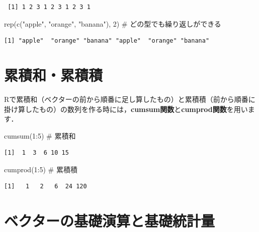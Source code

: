 \documentclass[
  letterpaper,
  DIV=11,
  numbers=noendperiod]{scrreprt}
\newenvironment{Shaded}{\begin{snugshade}}{\end{snugshade}}
\newcommand{\CommentTok}[1]{\textcolor[rgb]{0.37,0.37,0.37}{#1}}
\newcommand{\DecValTok}[1]{\textcolor[rgb]{0.68,0.00,0.00}{#1}}
\newcommand{\FunctionTok}[1]{\textcolor[rgb]{0.28,0.35,0.67}{#1}}
\newcommand{\NormalTok}[1]{\textcolor[rgb]{0.00,0.23,0.31}{#1}}
\newcommand{\SpecialCharTok}[1]{\textcolor[rgb]{0.37,0.37,0.37}{#1}}
\newcommand{\StringTok}[1]{\textcolor[rgb]{0.13,0.47,0.30}{#1}}
\begin{document}
\begin{verbatim}
 [1] 1 2 3 1 2 3 1 2 3 1
\end{verbatim}

\begin{Shaded}
\begin{Highlighting}[]
\FunctionTok{rep}\NormalTok{(}\FunctionTok{c}\NormalTok{(}\StringTok{"apple"}\NormalTok{, }\StringTok{"orange"}\NormalTok{, }\StringTok{"banana"}\NormalTok{), }\DecValTok{2}\NormalTok{) }\CommentTok{\# どの型でも繰り返しができる}
\end{Highlighting}
\end{Shaded}

\begin{verbatim}
[1] "apple"  "orange" "banana" "apple"  "orange" "banana"
\end{verbatim}

\hypertarget{ux7d2fux7a4dux548cux7d2fux7a4dux7a4d}{%
\section{累積和・累積積}\label{ux7d2fux7a4dux548cux7d2fux7a4dux7a4d}}

Rで累積和（ベクターの前から順番に足し算したもの）と累積積（前から順番に掛け算したもの）の数列を作る時には，\textbf{cumsum関数}と\textbf{cumprod関数}を用います．

\begin{Shaded}
\begin{Highlighting}[]
\FunctionTok{cumsum}\NormalTok{(}\DecValTok{1}\SpecialCharTok{:}\DecValTok{5}\NormalTok{) }\CommentTok{\# 累積和}
\end{Highlighting}
\end{Shaded}

\begin{verbatim}
[1]  1  3  6 10 15
\end{verbatim}

\begin{Shaded}
\begin{Highlighting}[]
\FunctionTok{cumprod}\NormalTok{(}\DecValTok{1}\SpecialCharTok{:}\DecValTok{5}\NormalTok{) }\CommentTok{\# 累積積}
\end{Highlighting}
\end{Shaded}

\begin{verbatim}
[1]   1   2   6  24 120
\end{verbatim}

\hypertarget{ux30d9ux30afux30bfux30fcux306eux57faux790eux6f14ux7b97ux3068ux57faux790eux7d71ux8a08ux91cf}{%
\section{ベクターの基礎演算と基礎統計量}\label{ux30d9ux30afux30bfux30fcux306eux57faux790eux6f14ux7b97ux3068ux57faux790eux7d71ux8a08ux91cf}}
\end{document}

